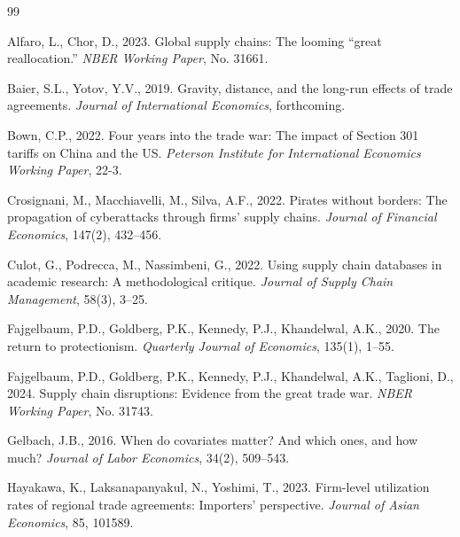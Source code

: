 \documentclass[preprint,12pt,authoryear]{elsarticle}
\begin{document}

\begin{thebibliography}{99}

Alfaro, L., Chor, D., 2023.
\newblock Global supply chains: The looming ``great reallocation.''
\newblock \textit{NBER Working Paper}, No. 31661.

Baier, S.L., Yotov, Y.V., 2019.
\newblock Gravity, distance, and the long-run effects of trade agreements.
\newblock \textit{Journal of International Economics}, forthcoming.

Bown, C.P., 2022.
\newblock Four years into the trade war: The impact of Section 301 tariffs on China and the US.
\newblock \textit{Peterson Institute for International Economics Working Paper}, 22-3.

Crosignani, M., Macchiavelli, M., Silva, A.F., 2022.
\newblock Pirates without borders: The propagation of cyberattacks through firms' supply chains.
\newblock \textit{Journal of Financial Economics}, 147(2), 432--456.

Culot, G., Podrecca, M., Nassimbeni, G., 2022.
\newblock Using supply chain databases in academic research: A methodological critique.
\newblock \textit{Journal of Supply Chain Management}, 58(3), 3--25.

Fajgelbaum, P.D., Goldberg, P.K., Kennedy, P.J., Khandelwal, A.K., 2020.
\newblock The return to protectionism.
\newblock \textit{Quarterly Journal of Economics}, 135(1), 1--55.

Fajgelbaum, P.D., Goldberg, P.K., Kennedy, P.J., Khandelwal, A.K., Taglioni, D., 2024.
\newblock Supply chain disruptions: Evidence from the great trade war.
\newblock \textit{NBER Working Paper}, No. 31743.

Gelbach, J.B., 2016.
\newblock When do covariates matter? And which ones, and how much?
\newblock \textit{Journal of Labor Economics}, 34(2), 509--543.

Hayakawa, K., Laksanapanyakul, N., Yoshimi, T., 2023.
\newblock Firm-level utilization rates of regional trade agreements: Importers' perspective.
\newblock \textit{Journal of Asian Economics}, 85, 101589.


\end{thebibliography}
\end{document}
